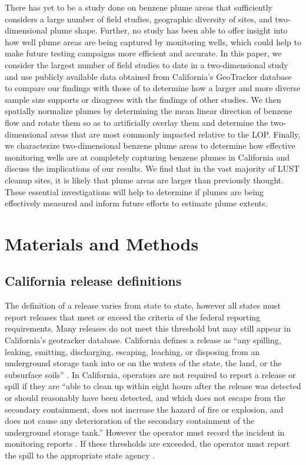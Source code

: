 \documentclass[draft,linenumbers]{agujournal2018}
\begin{document}
There has yet to be a study done on benzene plume areas that
sufficiently considers a large number of field studies, geographic
diversity of sites, and two-dimensional plume shape. Further, no study
has been able to offer insight into how well plume areas are being
captured by monitoring wells, which could help to make future testing
campaigns more efficient and accurate. In this paper, we consider the
largest number of field studies to date in a two-dimensional study and
use publicly available data obtained from California's GeoTracker
database to compare our findings with those of \citet{connor2015} to
determine how a larger and more diverse sample size supports or
disagrees with the findings of other studies. We then spatially
normalize plumes by determining the mean linear direction of benzene
flow and rotate them so as to artificially overlay them and determine
the two-dimensional areas that are most commonly impacted relative to
the LOP. Finally, we characterize two-dimensional benzene plume areas to
determine how effective monitoring wells are at completely capturing
benzene plumes in California and discuss the implications of our
results. We find that in the vast majority of LUST cleanup sites, it is
likely that plume areas are larger than previously thought. These
essential investigations will help to determine if plumes are being
effectively measured and inform future efforts to estimate plume
extents.

\section{Materials and Methods}

\subsection{California release definitions}

The definition of a release varies from state to state, however all
states must report releases that meet or exceed the criteria of the
federal reporting requirements. Many releases do not meet this threshold
but may still appear in California's geotracker database. California
defines a release as ``any spilling, leaking, emitting, discharging,
escaping, leaching, or disposing from an underground storage tank into
or on the waters of the state, the land, or the subsurface soils''
\citep{careport25295.5}. In California, operators are not required to
report a release or spill if they are ``able to clean up within eight
hours after the release was detected or should reasonably have been
detected, and which does not escape from the secondary containment, does
not increase the hazard of fire or explosion, and does not cause any
deterioration of the secondary containment of the underground storage
tank.'' However the operator must record the incident in monitoring
reports \citep{careport25294}. If these thresholds are exceeded, the
operator must report the spill to the appropriate state agency
\citep{careport25295}.
\end{document}

